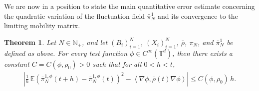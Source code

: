 \documentclass[UTF-8,reqno]{amsart}
\numberwithin{equation}{section}
\newtheorem{theorem}{Theorem}[section]
\def\leq{\leqslant}
\def\leq{\leqslant}
\begin{document}
We are now in a position to state the main quantitative error estimate concerning the quadratic variation of the fluctuation field $\bar{\pi}^1_N$ and its convergence to the limiting mobility matrix.  
\begin{theorem}
	Let $N \in \mathbb{N}_+$, and let $(B_i)_{i=1}^N$, $(X_i)_{i=1}^N$, $\bar{\rho}$, $\pi_N$, and $\bar{\pi}^1_N$ be defined as above. For every test function $\phi \in C^\infty(\mathbb{T}^d)$, then there exists a constant $C = C(\phi, \rho_0) > 0$ such that for all $0 < h < t$,
\begin{align*}
\left| \frac{1}{h} \, \mathbb{E} \left( \bar{\pi}^{1,\phi}_N(t+h) - \bar{\pi}^{1,\phi}_N(t) \right)^2 - \left\langle \nabla \phi, \bar{\rho}(t) \nabla \phi \right\rangle \right| \leq C(\phi, \rho_0) \, h.
\end{align*}
\end{theorem}
\end{document}
